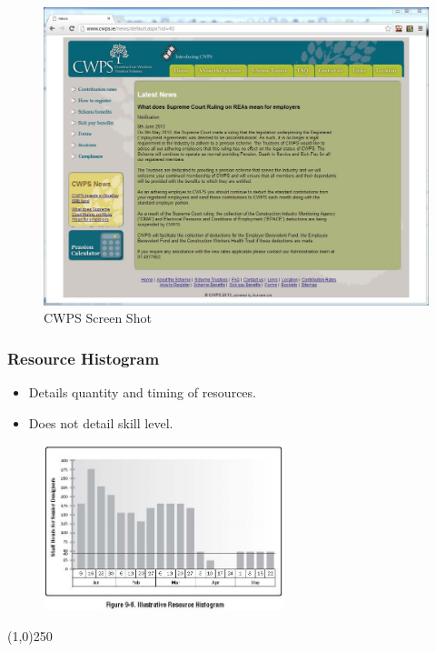 \begin{figure}[htbp]
	\centering
		\includegraphics[width=14cm]{images/CWPS.JPG}
	\caption{CWPS Screen Shot}
	\label{fig:CWPS}
\end{figure}











\begin{frame}
\frametitle{Resource Histogram}
\begin{itemize}
	\item Details quantity and timing of resources.
	\item Does not detail skill level.
\end{itemize}
\begin{figure}
	\centering
		\includegraphics[width = 7cm]{images/Fig9-6.jpg}
	\label{fig:9-6}
\end{figure}
\end{frame}\begin{center}\line(1,0){250}\end{center}


